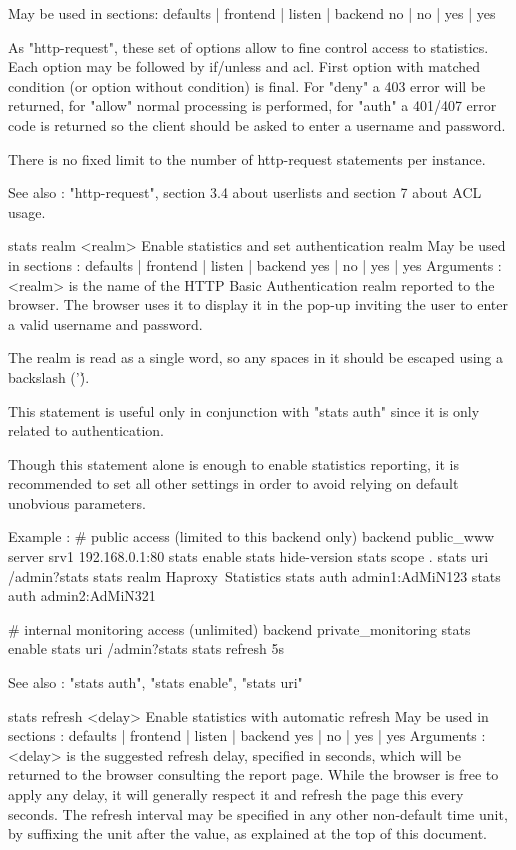   May be used in sections:   defaults | frontend | listen | backend
                                no    |    no    |   yes  |   yes

  As "http-request", these set of options allow to fine control access to
  statistics. Each option may be followed by if/unless and acl.
  First option with matched condition (or option without condition) is final.
  For "deny" a 403 error will be returned, for "allow" normal processing is
  performed, for "auth" a 401/407 error code is returned so the client
  should be asked to enter a username and password.

  There is no fixed limit to the number of http-request statements per
  instance.

  See also : "http-request", section 3.4 about userlists and section 7
             about ACL usage.


stats realm <realm>
  Enable statistics and set authentication realm
  May be used in sections :   defaults | frontend | listen | backend
                                 yes   |    no    |   yes  |   yes
  Arguments :
    <realm>   is the name of the HTTP Basic Authentication realm reported to
              the browser. The browser uses it to display it in the pop-up
              inviting the user to enter a valid username and password.

  The realm is read as a single word, so any spaces in it should be escaped
  using a backslash ('\').

  This statement is useful only in conjunction with "stats auth" since it is
  only related to authentication.

  Though this statement alone is enough to enable statistics reporting, it is
  recommended to set all other settings in order to avoid relying on default
  unobvious parameters.

  Example :
    # public access (limited to this backend only)
    backend public_www
        server srv1 192.168.0.1:80
        stats enable
        stats hide-version
        stats scope   .
        stats uri     /admin?stats
        stats realm   Haproxy\ Statistics
        stats auth    admin1:AdMiN123
        stats auth    admin2:AdMiN321

    # internal monitoring access (unlimited)
    backend private_monitoring
        stats enable
        stats uri     /admin?stats
        stats refresh 5s

  See also : "stats auth", "stats enable", "stats uri"


stats refresh <delay>
  Enable statistics with automatic refresh
  May be used in sections :   defaults | frontend | listen | backend
                                 yes   |    no    |   yes  |   yes
  Arguments :
    <delay>   is the suggested refresh delay, specified in seconds, which will
              be returned to the browser consulting the report page. While the
              browser is free to apply any delay, it will generally respect it
              and refresh the page this every seconds. The refresh interval may
              be specified in any other non-default time unit, by suffixing the
              unit after the value, as explained at the top of this document.

